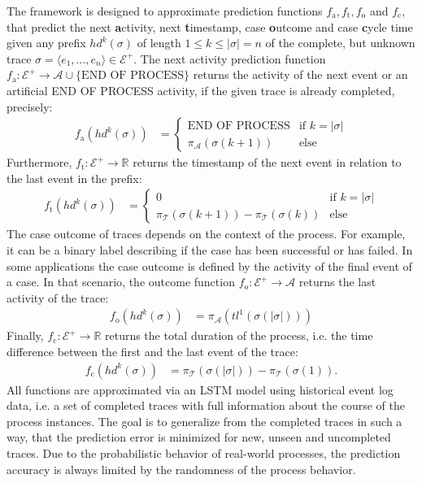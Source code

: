 The framework is designed to approximate prediction functions $f_\mathrm{a}, f_\mathrm{t}, f_\mathrm{o}$ and $f_\mathrm{c}$, that predict the next \textbf{a}ctivity, next \textbf{t}imestamp, case \textbf{o}utcome and case \textbf{c}ycle time given any prefix $hd^k(\sigma)$ of length $1 \leq k \leq |\sigma| = n$ of the complete, but unknown trace $\sigma = \langle e_1, \dots, e_{n} \rangle \in \mathcal{E}^+$.
The next activity prediction function $f_\mathrm{a}\colon \mathcal{E}^+ \to \mathcal{A} \cup \{\text{END OF PROCESS}\}$ returns the activity of the next event or an artificial END OF PROCESS activity, if the given trace is already completed, precisely:
\begin{align*}
f_\mathrm{a}(hd^k(\sigma)) &= 
\begin{cases}
	\text{END OF PROCESS}& \text{if $k = |\sigma|$} \\
	\pi_\mathcal{A}(\sigma(k+1)) & \text{else} 
\end{cases}
\end{align*}
Furthermore, $f_\mathrm{t} \colon \mathcal{E}^+ \to \mathbb{R}$ returns the timestamp of the next event in relation to the last event in the prefix:
\begin{align*}
f_\mathrm{t}(hd^k(\sigma)) &=
\begin{cases}
0 & \text{if $k = |\sigma|$} \\
\pi_\mathcal{T}(\sigma(k+1)) - \pi_\mathcal{T}(\sigma(k)) & \text{else} 
\end{cases}
\end{align*}
The case outcome of traces depends on the context of the process.
For example, it can be a binary label describing if the case has been successful or has failed.
In some applications the case outcome is defined by the activity of the final event of a case.
In that scenario, the outcome function $f_\mathrm{o} \colon \mathcal{E}^+ \to \mathcal{A}$ returns the last activity of the trace:
\begin{align*}
f_\mathrm{o}(hd^k(\sigma)) &= \pi_\mathcal{A}(tl^1(\sigma(|\sigma|)))
\end{align*}
Finally, $f_\mathrm{c} \colon \mathcal{E}^+ \to \mathbb{R}$ returns the total duration of the process, i.e. the time difference between the first and the last event of the trace:
\begin{align*}
f_\mathrm{c}(hd^k(\sigma)) &=  \pi_\mathcal{T}(\sigma(|\sigma|))-  \pi_\mathcal{T}(\sigma(1)).
\end{align*}
All functions are approximated via an LSTM model using historical event log data, i.e. a set of completed traces with full information about the course of the process instances.
The goal is to generalize from the completed traces in such a way, that the prediction error is minimized for new, unseen and uncompleted traces.
Due to the probabilistic behavior of real-world processes, the prediction accuracy is always limited by the randomness of the process behavior.

